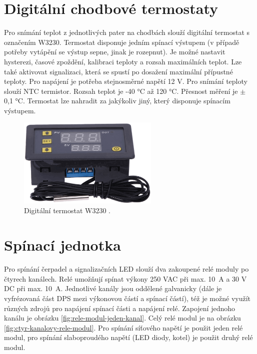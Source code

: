 





\section{Digitální chodbové termostaty}
\label{sec:digitalni-chodbove-termostaty}
Pro snímání teplot z jednotlivých pater na chodbách slouží digitální termostat s označením W3230. Termostat disponuje jedním spínací výstupem (v případě potřeby vytápění se výstup sepne, jinak je rozepnut). Je možné nastavit hysterezi, časové zpoždění, kalibraci teploty a rozsah maximálních teplot. Lze také aktivovat signalizaci, která se spustí po dosažení maximální přípustné teploty. Pro napájení je potřeba stejnosměrné napětí 12 V. Pro snímání teploty slouží NTC termistor. Rozsah teplot je -40 °C až 120 °C. Přesnost měření je $\pm$ 0,1 °C. Termostat lze nahradit za jakýkoliv jiný, který disponuje spínacím výstupem.


\begin{figure}[H]
    \centering
    \includegraphics[width=0.6\textwidth]{images/digitalni-termostat-w3230.png}
    \caption[Digitální termostat W3230.]{Digitální termostat W3230 \cite{digitalni-termostat-w3230}.}
    \label{fig:digitalni-termostat-w3230}
\end{figure}


\section{Spínací jednotka}
Pro spínání čerpadel a signalizačních LED slouží dva zakoupené relé moduly po čtyrech kanálech. Relé umožňují spínat výkony 250 VAC při max. 10~A a 30 V DC při max. 10~A. Jednotlivé kanály jsou oddělené galvanicky (dále je vyfrézovaná část DPS mezi výkonovou částí a spínací částí), též je možné využít různých zdrojů pro napájení spínací části a napájení relé. Zapojení jednoho kanálu je obrázku \ref{fig:rele-modul-jeden-kanal}. Celý relé modul je na obrázku \ref{fig:ctyr-kanalovy-rele-modul}. Pro spínání síťového napětí je použit jeden relé modul, pro spínání slaboproudého napětí (LED diody, kotel) je použit druhý relé modul.

